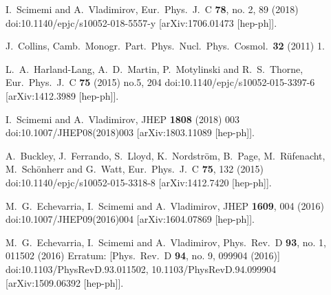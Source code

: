 \documentclass[prd,nofootinbib,eqsecnum,final]{revtex4}
\renewcommand{\(}{\left(}
\renewcommand{\)}{\right)}
\renewcommand{\[}{\left[}
\renewcommand{\]}{\right]}
\begin{document}
\begin{thebibliography}{10}

  I.~Scimemi and A.~Vladimirov,
  Eur.\ Phys.\ J.\ C {\bf 78}, no. 2, 89 (2018)
  doi:10.1140/epjc/s10052-018-5557-y
  [arXiv:1706.01473 [hep-ph]].

  J.~Collins,
  Camb.\ Monogr.\ Part.\ Phys.\ Nucl.\ Phys.\ Cosmol.\  {\bf 32} (2011) 1.

  L.~A.~Harland-Lang, A.~D.~Martin, P.~Motylinski and R.~S.~Thorne,
  Eur.\ Phys.\ J.\ C {\bf 75} (2015) no.5,  204
  doi:10.1140/epjc/s10052-015-3397-6
  [arXiv:1412.3989 [hep-ph]].
  
  I.~Scimemi and A.~Vladimirov,
  JHEP {\bf 1808} (2018) 003
  doi:10.1007/JHEP08(2018)003
  [arXiv:1803.11089 [hep-ph]].
  
  A.~Buckley, J.~Ferrando, S.~Lloyd, K.~Nordström, B.~Page, M.~Rüfenacht, M.~Schönherr and G.~Watt,
  Eur.\ Phys.\ J.\ C {\bf 75}, 132 (2015)
  doi:10.1140/epjc/s10052-015-3318-8
  [arXiv:1412.7420 [hep-ph]].

  M.~G.~Echevarria, I.~Scimemi and A.~Vladimirov,
  JHEP {\bf 1609}, 004 (2016)
  doi:10.1007/JHEP09(2016)004
  [arXiv:1604.07869 [hep-ph]].
  
  M.~G.~Echevarria, I.~Scimemi and A.~Vladimirov,
  Phys.\ Rev.\ D {\bf 93}, no. 1, 011502 (2016)
  Erratum: [Phys.\ Rev.\ D {\bf 94}, no. 9, 099904 (2016)]
  doi:10.1103/PhysRevD.93.011502, 10.1103/PhysRevD.94.099904
  [arXiv:1509.06392 [hep-ph]].


\end{thebibliography}
\end{document}
